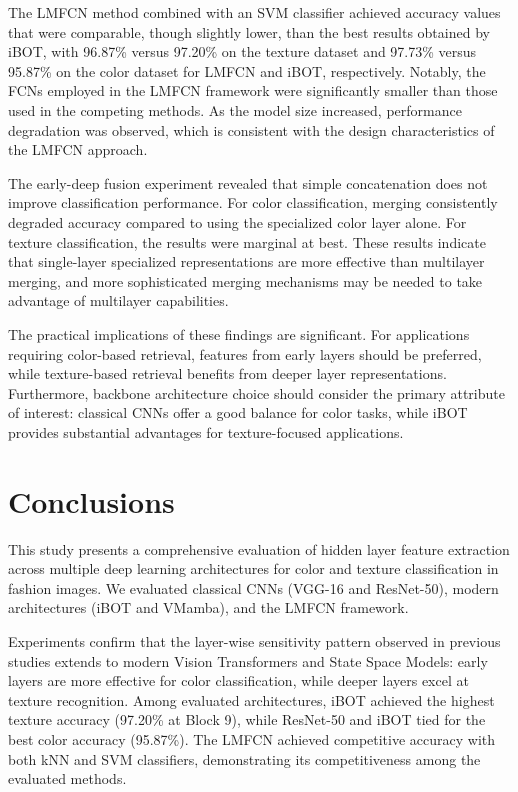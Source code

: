 \documentclass[conference]{IEEEtran}
\begin{document}
The LMFCN method combined with an SVM classifier achieved accuracy values that were comparable, though slightly lower, than the best results obtained by iBOT, with 96.87\% versus 97.20\% on the texture dataset and 97.73\% versus 95.87\% on the color dataset for LMFCN and iBOT, respectively. Notably, the FCNs employed in the LMFCN framework were significantly smaller than those used in the competing methods. As the model size increased, performance degradation was observed, which is consistent with the design characteristics of the LMFCN approach.

The early-deep fusion experiment revealed that simple
concatenation does not improve classification performance. For color classification, merging consistently degraded accuracy compared to using the specialized color layer alone. For texture classification, the results were marginal at best. These results indicate that single-layer specialized representations are more effective than multilayer merging, and more sophisticated merging mechanisms may be needed to take advantage of multilayer capabilities.

The practical implications of these findings are significant. For applications requiring color-based retrieval, features from early layers should be preferred, while texture-based retrieval benefits from deeper layer representations. Furthermore, backbone architecture choice should consider the primary attribute of interest: classical CNNs offer a good balance for color tasks, while iBOT provides substantial advantages for texture-focused applications.


\section{Conclusions}

This study presents a comprehensive evaluation of hidden layer feature extraction across multiple deep learning architectures for color and texture classification in fashion images. We evaluated classical CNNs (VGG-16 and ResNet-50), modern architectures (iBOT and VMamba), and the LMFCN framework.

Experiments confirm that the layer-wise sensitivity pattern observed in previous studies extends to modern Vision Transformers and State Space Models: early layers are more effective for color classification, while deeper layers excel at texture recognition. Among evaluated architectures, iBOT achieved the highest texture accuracy (97.20\% at Block 9), while ResNet-50 and iBOT tied for the best color accuracy (95.87\%). The LMFCN achieved competitive accuracy with both kNN and SVM classifiers, demonstrating its competitiveness among the evaluated methods.
\end{document}
